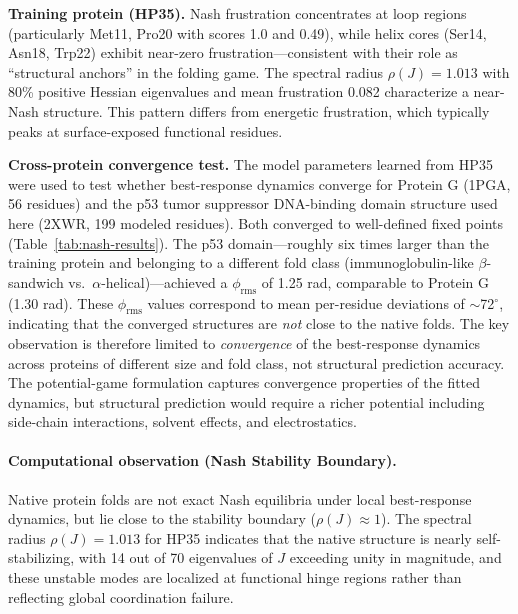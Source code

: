 \documentclass[12pt,a4paper]{article}
\theoremstyle{remark}
\begin{document}
\textbf{Training protein (HP35).} Nash frustration concentrates at loop regions (particularly Met11, Pro20 with scores 1.0 and 0.49), while helix cores (Ser14, Asn18, Trp22) exhibit near-zero frustration---consistent with their role as ``structural anchors'' in the folding game. The spectral radius $\rho(J) = 1.013$ with 80\% positive Hessian eigenvalues and mean frustration 0.082 characterize a near-Nash structure. This pattern differs from energetic frustration, which typically peaks at surface-exposed functional residues.

\textbf{Cross-protein convergence test.} The model parameters learned from HP35 were used to test whether best-response dynamics converge for Protein G (1PGA, 56 residues) and the p53 tumor suppressor DNA-binding domain structure used here (2XWR, 199 modeled residues). Both converged to well-defined fixed points (Table~\ref{tab:nash-results}). The p53 domain---roughly six times larger than the training protein and belonging to a different fold class (immunoglobulin-like $\beta$-sandwich vs.\ $\alpha$-helical)---achieved a $\phi_{\text{rms}}$ of 1.25 rad, comparable to Protein G (1.30 rad). These $\phi_{\text{rms}}$ values correspond to mean per-residue deviations of $\sim$72$^\circ$, indicating that the converged structures are \emph{not} close to the native folds. The key observation is therefore limited to \emph{convergence} of the best-response dynamics across proteins of different size and fold class, not structural prediction accuracy. The potential-game formulation captures convergence properties of the fitted dynamics, but structural prediction would require a richer potential including side-chain interactions, solvent effects, and electrostatics.

\paragraph{Computational observation (Nash Stability Boundary).}
Native protein folds are not exact Nash equilibria under local best-response dynamics, but lie close to the stability boundary ($\rho(J) \approx 1$). The spectral radius $\rho(J) = 1.013$ for HP35 indicates that the native structure is nearly self-stabilizing, with 14 out of 70 eigenvalues of $J$ exceeding unity in magnitude, and these unstable modes are localized at functional hinge regions rather than reflecting global coordination failure.
\end{document}
